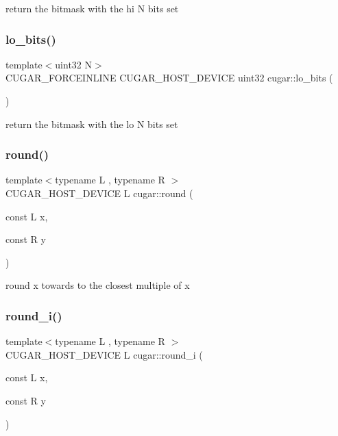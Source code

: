 return the bitmask with the hi N bits set \mbox{\label{group___basic_utils_gaf1c33dd2c16b4650bae4a033c14f39a5}} 
\subsubsection{\texorpdfstring{lo\+\_\+bits()}{lo\_bits()}}
{\footnotesize\ttfamily template$<$uint32 N$>$ \\
C\+U\+G\+A\+R\+\_\+\+F\+O\+R\+C\+E\+I\+N\+L\+I\+NE C\+U\+G\+A\+R\+\_\+\+H\+O\+S\+T\+\_\+\+D\+E\+V\+I\+CE uint32 cugar\+::lo\+\_\+bits (\begin{DoxyParamCaption}{ }\end{DoxyParamCaption})}

return the bitmask with the lo N bits set \mbox{\label{group___basic_utils_ga6d264db70d9d9d514ced6ae7e74372ff}} 
\subsubsection{\texorpdfstring{round()}{round()}}
{\footnotesize\ttfamily template$<$typename L , typename R $>$ \\
C\+U\+G\+A\+R\+\_\+\+H\+O\+S\+T\+\_\+\+D\+E\+V\+I\+CE L cugar\+::round (\begin{DoxyParamCaption}\item[{const L}]{x,  }\item[{const R}]{y }\end{DoxyParamCaption})\hspace{0.3cm}{\ttfamily [inline]}}

round x towards to the closest multiple of x \mbox{\label{group___basic_utils_gab417c685b4c9fc81ccb34e970d4fbc7d}} 
\subsubsection{\texorpdfstring{round\+\_\+i()}{round\_i()}}
{\footnotesize\ttfamily template$<$typename L , typename R $>$ \\
C\+U\+G\+A\+R\+\_\+\+H\+O\+S\+T\+\_\+\+D\+E\+V\+I\+CE L cugar\+::round\+\_\+i (\begin{DoxyParamCaption}\item[{const L}]{x,  }\item[{const R}]{y }\end{DoxyParamCaption})\hspace{0.3cm}{\ttfamily [inline]}}

